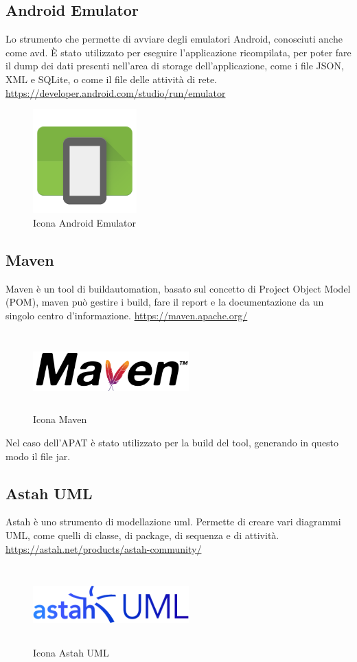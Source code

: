 \subsection*{Android Emulator}
Lo strumento che permette di avviare degli emulatori Android, conosciuti anche come \gls{avd}.
È stato utilizzato per eseguire l'applicazione ricompilata, per poter fare il dump dei dati presenti nell'area di storage dell'applicazione, come i file JSON, XML e SQLite, o come il file delle attività di rete.
\url{https://developer.android.com/studio/run/emulator}
\begin{figure}[H]
    \centering
    \includegraphics[width=4cm, height=4cm]{./immagini/emulator.png}
    \caption{Icona Android Emulator}\label{fig:emulator}
\end{figure}

\subsection*{Maven}
Maven è un tool di \gls{buildautomation}, basato sul concetto di Project Object Model (POM), maven può gestire i build, fare il report e la documentazione da un singolo centro d'informazione.
\url{https://maven.apache.org/}
\begin{figure}[H]
    \centering
    \includegraphics[width=6cm, height=3cm]{./immagini/maven.png}
    \caption{Icona Maven}\label{fig:maven}
\end{figure}
Nel caso dell'APAT è stato utilizzato per la build del tool, generando in questo modo il file jar.

\subsection*{Astah UML}
Astah è uno strumento di modellazione \gls{uml}. Permette di creare vari diagrammi UML, come quelli di classe, di package, di sequenza e di attività.
\url{https://astah.net/products/astah-community/}
\begin{figure}[H]
    \centering
    \includegraphics[width=6cm, height=3cm]{./immagini/astah.png}
    \caption{Icona Astah UML}\label{fig:astah}
\end{figure}

